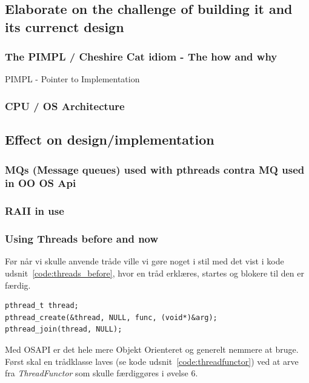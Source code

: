 \subsection{Elaborate on the challenge of building it and its currenct design}

\subsubsection{The PIMPL / Cheshire Cat idiom - The how and why}

PIMPL - Pointer to Implementation

\subsubsection{CPU / OS Architecture}

\subsection{Effect on design/implementation}

\subsubsection{MQs (Message queues) used with pthreads contra MQ used in OO OS Api}

\subsubsection{RAII in use}

\subsubsection{Using Threads before and now}
Før når vi skulle anvende tråde ville vi gøre noget i stil med det vist i kode udsnit~\ref{code:threads_before}, hvor en tråd erklæres, startes og blokere til den er færdig.

\begin{lstlisting}[caption=Anvendelse af tråde før OSAPI, label=code:threads_before, morekeywords={pthread_t, pthread_create, pthread_join}]
pthread_t thread;
pthread_create(&thread, NULL, func, (void*)&arg);
pthread_join(thread, NULL);
\end{lstlisting}

Med OSAPI er det hele mere Objekt Orienteret og generelt nemmere at bruge. Først skal en trådklasse laves (se kode udsnit~\ref{code:threadfunctor}) ved at arve fra \textit{ThreadFunctor} som skulle færdiggøres i øvelse 6.

